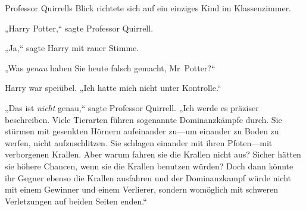 Professor Quirrells Blick richtete sich auf ein einziges Kind im Klassenzimmer.

„Harry Potter,“ sagte Professor Quirrell.

„Ja,“ sagte Harry mit rauer Stimme.

„Was \emph{genau} haben Sie heute falsch gemacht, Mr~Potter?“

Harry war speiübel. „Ich hatte mich nicht unter Kontrolle.“

„Das ist \emph{nicht} genau,“ sagte Professor Quirrell. „Ich werde es präziser beschreiben. Viele Tierarten führen sogenannte Dominanzkämpfe durch. Sie stürmen mit gesenkten Hörnern aufeinander zu—um einander zu Boden zu werfen, nicht aufzuschlitzen. Sie schlagen einander mit ihren Pfoten—mit verborgenen Krallen. Aber warum fahren sie die Krallen nicht aus? Sicher hätten sie höhere Chancen, wenn sie die Krallen benutzen würden? Doch dann könnte ihr Gegner ebenso die Krallen ausfahren und der Dominanzkampf würde nicht mit einem Gewinner und einem Verlierer, sondern womöglich mit schweren Verletzungen auf beiden Seiten enden.“

